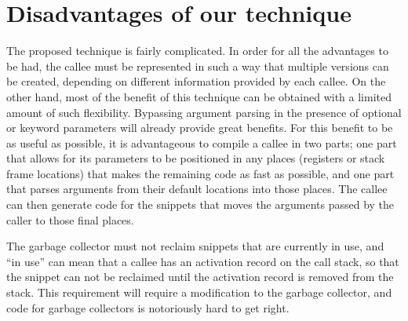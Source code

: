 \section{Disadvantages of our technique}

The proposed technique is fairly complicated.  In order for all the
advantages to be had, the callee must be represented in such a way
that multiple versions can be created, depending on different
information provided by each callee.  On the other hand, most of the
benefit of this technique can be obtained with a limited amount of
such flexibility.  Bypassing argument parsing in the presence of
optional or keyword parameters will already provide great benefits.
For this benefit to be as useful as possible, it is advantageous to
compile a callee in two parts; one part that allows for its parameters
to be positioned in any places (registers or stack frame locations)
that makes the remaining code as fast as possible, and one part that
parses arguments from their default locations into those places.  The
callee can then generate code for the snippets that moves the
arguments passed by the caller to those final places.

The garbage collector must not reclaim snippets that are currently in
use, and ``in use'' can mean that a callee has an activation record on
the call stack, so that the snippet can not be reclaimed until the
activation record is removed from the stack.  This requirement will
require a modification to the garbage collector, and code for garbage
collectors is notoriously hard to get right.

